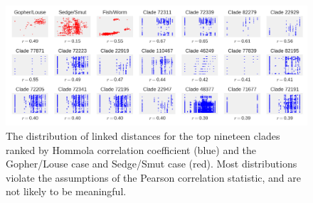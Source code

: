\begin{figure}
    \includegraphics[width=\textwidth]{FishPoo/figures/High_correlation_clades.png}
    \caption{The distribution of linked distances for the top nineteen clades ranked by Hommola correlation coefficient (blue) and the Gopher/Louse case and Sedge/Smut case (red). Most distributions violate the assumptions of the Pearson correlation statistic, and are not likely to be meaningful. }
    \label{FP_highcorr}
\end{figure}
